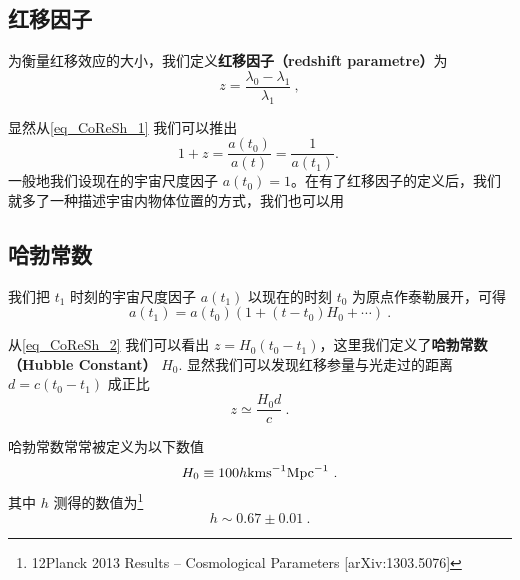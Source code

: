 \subsection{红移因子}
\begin{definition}{}
为衡量红移效应的大小，我们定义\textbf{红移因子（redshift parametre）}为
\begin{equation}
z=\frac{\lambda_0-\lambda_1}{\lambda_1}~,
\end{equation}
\end{definition}
显然从\autoref{eq_CoReSh_1} 我们可以推出
\begin{equation}
1+z=\frac{a(t_0)}{a(t)}=\frac{1}{a(t_1)}. \label{eq_CoReSh_2}~
\end{equation}
一般地我们设现在的宇宙尺度因子 $a(t_0)=1$。在有了红移因子的定义后，我们就多了一种描述宇宙内物体位置的方式，我们也可以用

\subsection{哈勃常数}
我们把 $t_1$ 时刻的宇宙尺度因子 $a(t_1)$ 以现在的时刻 $t_0$ 为原点作泰勒展开，可得
\begin{equation}
a(t_1)=a(t_0)(1+(t-t_0)H_0+\cdots)~.
\end{equation}

从\autoref{eq_CoReSh_2} 我们可以看出 $z=H_0(t_0-t_1)$，这里我们定义了\textbf{哈勃常数（Hubble Constant）} $H_0$. 显然我们可以发现红移参量与光走过的距离 $d=c(t_0-t_1)$ 成正比
\begin{equation}
z\simeq\frac{H_0d}{c}~.
\end{equation}

哈勃常数常常被定义为以下数值
\begin{equation}
H_0 \equiv100 h {\rm kms}^{-1}{\rm Mpc}^{-1}~.
\end{equation}
其中 $h$ 测得的数值为\footnote{12Planck 2013 Results – Cosmological Parameters [arXiv:1303.5076]}
\begin{equation}
h\sim 0.67 \pm 0.01~.
\end{equation}
